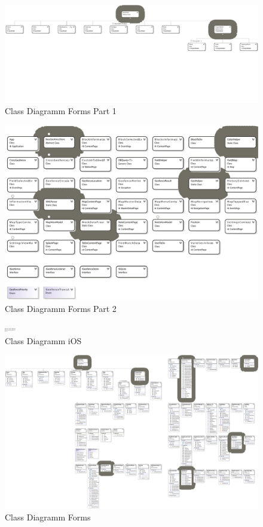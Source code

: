 \documentclass[12pt]{article}
\begin{document}
	\pagestyle{empty}

	\begin{figure}[ht]
  		\centering
	  	\includegraphics[width=\textheight,keepaspectratio=true,angle=90]{ClassDiagram1-part1.pdf}
	  	\caption{Class Diagramm Forms Part 1\label{fig:ClassDiagramPart1}}
	\end{figure}

	\begin{figure}[ht]
	  	\centering
	  	\includegraphics[width=\textheight,keepaspectratio=true,angle=90]{ClassDiagram1-part2.pdf}
	  	\caption{Class Diagramm Forms Part 2\label{fig:ClassDiagramPart2}}
	\end{figure}
  
  \clearpage

	\begin{figure}[ht]
	  	\centering
	  	\includegraphics[width=\textheight,keepaspectratio=true,angle=90]{ClassDiagramiOS.pdf}
	  	\caption{Class Diagramm iOS\label{fig:ClassDiagramIos}}
	\end{figure}

	\begin{figure}[ht]
		\centering
	  	\includegraphics[width=\textheight,keepaspectratio=true,angle=90]{ClassDiagramForms.pdf}
	  	\caption{Class Diagramm Forms\label{fig:ClassDiagramForms}}
	\end{figure}
\end{document}
